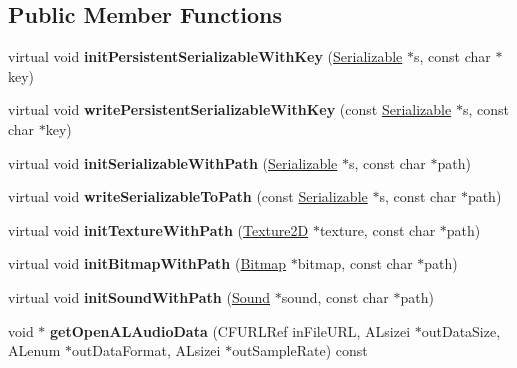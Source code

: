 \subsection*{Public Member Functions}
\begin{DoxyCompactItemize}
\item 
\hypertarget{classg2c_1_1_windows_bank_a8df2b4df3248d565aca7a85b1db6e8b2}{
virtual void {\bfseries initPersistentSerializableWithKey} (\hyperlink{classg2c_1_1_serializable}{Serializable} $\ast$s, const char $\ast$key)}
\label{classg2c_1_1_windows_bank_a8df2b4df3248d565aca7a85b1db6e8b2}

\item 
\hypertarget{classg2c_1_1_windows_bank_afb4f651b3529237c2b7554d79ee46520}{
virtual void {\bfseries writePersistentSerializableWithKey} (const \hyperlink{classg2c_1_1_serializable}{Serializable} $\ast$s, const char $\ast$key)}
\label{classg2c_1_1_windows_bank_afb4f651b3529237c2b7554d79ee46520}

\item 
\hypertarget{classg2c_1_1_windows_bank_a661ea280d1eff46c9333a22d8e259028}{
virtual void {\bfseries initSerializableWithPath} (\hyperlink{classg2c_1_1_serializable}{Serializable} $\ast$s, const char $\ast$path)}
\label{classg2c_1_1_windows_bank_a661ea280d1eff46c9333a22d8e259028}

\item 
\hypertarget{classg2c_1_1_windows_bank_a2f2ab74b7a01a0433a0d90028564ab59}{
virtual void {\bfseries writeSerializableToPath} (const \hyperlink{classg2c_1_1_serializable}{Serializable} $\ast$s, const char $\ast$path)}
\label{classg2c_1_1_windows_bank_a2f2ab74b7a01a0433a0d90028564ab59}

\item 
\hypertarget{classg2c_1_1_windows_bank_a51a30d90ab58c056005cede7cdc98ef2}{
virtual void {\bfseries initTextureWithPath} (\hyperlink{classg2c_1_1_texture2_d}{Texture2D} $\ast$texture, const char $\ast$path)}
\label{classg2c_1_1_windows_bank_a51a30d90ab58c056005cede7cdc98ef2}

\item 
\hypertarget{classg2c_1_1_windows_bank_a82f2c88f73ec24b205724cb38509f441}{
virtual void {\bfseries initBitmapWithPath} (\hyperlink{classg2c_1_1_bitmap}{Bitmap} $\ast$bitmap, const char $\ast$path)}
\label{classg2c_1_1_windows_bank_a82f2c88f73ec24b205724cb38509f441}

\item 
\hypertarget{classg2c_1_1_windows_bank_a8fb161bf739a0593ef94f1a41a297a6a}{
virtual void {\bfseries initSoundWithPath} (\hyperlink{classg2c_1_1_sound}{Sound} $\ast$sound, const char $\ast$path)}
\label{classg2c_1_1_windows_bank_a8fb161bf739a0593ef94f1a41a297a6a}

\item 
\hypertarget{classg2c_1_1_windows_bank_a3b8741751dfb82375030266ff6bd347f}{
void $\ast$ {\bfseries getOpenALAudioData} (CFURLRef inFileURL, ALsizei $\ast$outDataSize, ALenum $\ast$outDataFormat, ALsizei $\ast$outSampleRate) const }
\label{classg2c_1_1_windows_bank_a3b8741751dfb82375030266ff6bd347f}

\end{DoxyCompactItemize}
